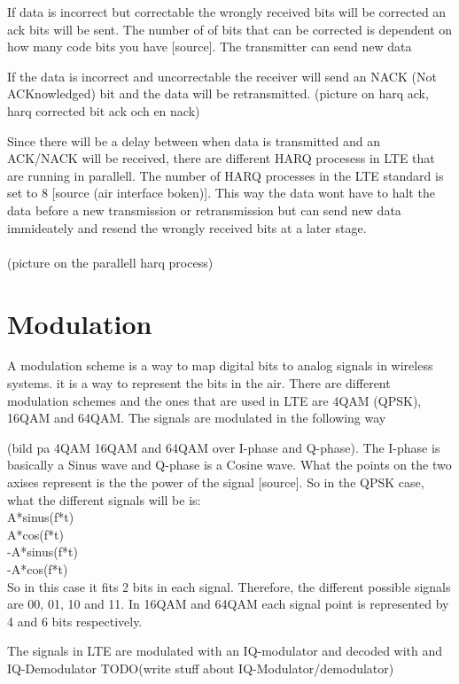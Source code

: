 \documentclass[cropmarks, frame, english]{idamasterthesis}
\begin{document}
If data is incorrect but correctable the wrongly received bits will be corrected an ack bits will be sent. The number of of bits that can be corrected is dependent on how many code bits you have [source]. The transmitter can send new data

If the data is incorrect and uncorrectable the receiver will send an NACK (Not ACKnowledged) bit and the data will be retransmitted.
(picture on harq ack, harq corrected bit ack och en nack)

Since there will be a delay between when data is transmitted and an ACK/NACK will be received, there are different HARQ procesess in LTE that are running in parallell. The number of HARQ processes in the LTE standard is set to 8 [source (air interface boken)]. This way the data wont have to halt the data before a new transmission or retransmission but can send new data immideately and resend the wrongly received bits at a later stage.
\\
\\
(picture on the parallell harq process)
\\

\section{Modulation}
A modulation scheme is a way to map digital bits to analog signals in wireless systems. it is a way to represent the bits in the air.
There are different modulation schemes and the ones that are used in LTE are 4QAM (QPSK), 16QAM and 64QAM. The signals are modulated in the following way

(bild pa 4QAM 16QAM and 64QAM over I-phase and Q-phase).
The I-phase is basically a Sinus wave and Q-phase is a Cosine wave. What the points on the two axises represent is the the power of the signal [source]. So in the QPSK case, what the different signals will be is:\\
A*sinus(f*t)\\
A*cos(f*t)\\
-A*sinus(f*t) \\
-A*cos(f*t)\\
So in this case it fits 2 bits in each signal. Therefore, the different possible signals are 00, 01, 10 and 11. In 16QAM and 64QAM each signal point is represented by 4 and 6 bits respectively.

The signals in LTE are modulated with an IQ-modulator and decoded with and IQ-Demodulator
TODO(write stuff about IQ-Modulator/demodulator)
\end{document}

